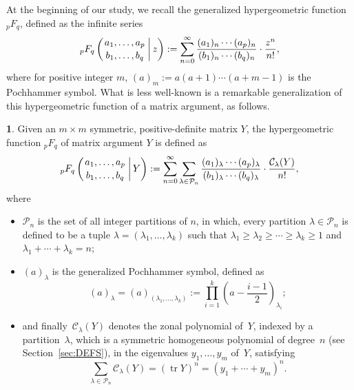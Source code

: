 \documentclass{mathincs}
\numberwithin{equation}{section}
\numberwithin{figure}{section}
\theoremstyle{plain}
\theoremstyle{definition}
\newtheorem{defn}[thm]{\protect\definitionname}
\theoremstyle{remark}
\theoremstyle{plain}
\theoremstyle{definition}
\theoremstyle{plain}
\theoremstyle{plain}
\DeclareMathOperator{\Tr}{tr}
\providecommand{\definitionname}{Definition}
\begin{document}
At the beginning of our study, we recall the generalized hypergeometric
function ${}_pF_q$, defined as the infinite series
\begin{equation}\label{eq:pFq}
  {}_pF_q\left(\genfrac{}{}{0pt}{}{a_{1},\ldots,a_{p}}{b_{1},\ldots,b_{q}}\,\bigg|\,z\right) :=
  \sum_{n=0}^{\infty}\frac{(a_{1})_{n}\cdots(a_{p})_{n}}{(b_{1})_{n}\cdots(b_{q})_{n}}\cdot\frac{z^{n}}{n!},
\end{equation}
where for positive integer $m$,
$(a)_{m}:=a(a+1)\cdots(a+m-1)$ is the
Pochhammer symbol.  What is less well-known is a remarkable generalization of
this hypergeometric function of a matrix argument, as follows.
\begin{defn}
Given an $m\times m$ symmetric, positive-definite matrix $Y$, the
hypergeometric function ${}_pF_q$ of matrix argument $Y$ is defined as 
\begin{equation}\label{eq:MatrixpFq}
  {}_{p}F_{q}\left(\genfrac{}{}{0pt}{}{a_{1},\ldots,a_{p}}{b_{1},\ldots,b_{q}}\,\bigg|\,Y\right) :=
  \sum_{n=0}^{\infty}\sum_{\lambda\in\mathcal{P}_{n}}\frac{(a_{1})_{\lambda}\cdots(a_{p})_{\lambda}}
      {(b_{1})_{\lambda}\cdots(b_{q})_{\lambda}}\cdot\frac{\mathcal{C}_{\lambda}(Y)}{n!},
\end{equation}
where 
\begin{itemize}
\item $\mathcal{P}_{n}$ is the set of all integer partitions of $n$, in which,
every partition $\lambda\in\mathcal{P}_{n}$ is defined to be a tuple
$\lambda=(\lambda_{1},\ldots,\lambda_{k})$ such that 
$\lambda_{1}\geq\lambda_{2}\geq\cdots\geq\lambda_{k}\geq 1$ and 
$ \lambda_{1}+\cdots+\lambda_{k}=n$;
\item $(a)_{\lambda}$ is the generalized Pochhammer symbol, defined as
\[
(a)_{\lambda}=(a)_{(\lambda_{1},\dots,\lambda_{k})}:=\prod_{i=1}^{k}\left(a-\frac{i-1}{2}\right)_{\!\!\lambda_{i}}\!\!;
\]
\item and finally~$\mathcal{C}_{\lambda}(Y)$ denotes the zonal polynomial
of~$Y$, indexed by a partition~$\lambda$, which is a symmetric homogeneous polynomial
of degree~$n$ (see Section~\ref{sec:DEFS}), in the eigenvalues
$y_{1},\ldots,y_{m}$ of~$Y$, satisfying 
\begin{equation}\label{eq:TrZonal}
  \sum_{\lambda\in\mathcal{P}_{n}}\mathcal{C}_{\lambda}(Y)=(\Tr Y)^{n}=(y_{1}+\cdots+y_{m})^{n}.
\end{equation}
\end{itemize}
\end{defn}
\end{document}
